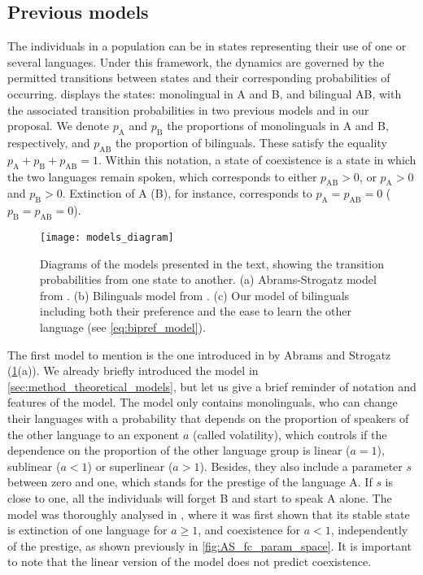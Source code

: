 \documentclass[../thesis.tex]{subfiles}
\begin{document}
\subsection{Previous models}
The individuals in a population can be in states representing their use of one or
several languages. Under this framework, the dynamics are governed by the permitted
transitions between states and their corresponding probabilities of occurring.
 displays the states: monolingual in A and B, and bilingual AB,
with the associated transition probabilities in two previous models and in our proposal.
We denote $p_{\text{A}}$ and $p_{\text{B}}$ the proportions of monolinguals in A and B,
respectively, and $p_{\text{AB}}$ the proportion of bilinguals. These satisfy the
equality $p_{\text{A}} + p_{\text{B}} + p_{\text{AB}} = 1$. Within this notation, a
state of coexistence is a state in which the two languages remain spoken, which
corresponds to either $p_{\text{AB}} > 0$, or $p_{\text{A}} > 0$ and $p_{\text{B}} > 0$.
Extinction of A (B), for instance, corresponds to $p_{\text{A}} = p_{\text{AB}} = 0$
($p_{\text{B}} = p_{\text{AB}} = 0$).
\begin{figure}
\centering
  \texttt{[image: models\_diagram]}
  \caption{Diagrams of the models presented in the text, showing the transition
  probabilities from one state to another. (a) Abrams-Strogatz model from
  \cite{AbramsModellingDynamics2003}. (b) Bilinguals model from
  \cite{CastelloOrderingDynamics2006}. (c) Our model of bilinguals including both
  their preference and the ease to learn the other language (see
  \cref{eq:bipref_model}).}
  \label{fig:multiling_models_diagram}
\end{figure}

The first model to mention is the one introduced in \cite{AbramsModellingDynamics2003}
by Abrams and Strogatz (\cref{fig:multiling_models_diagram}(a)). We already briefly introduced the
model in \cref{sec:method_theoretical_models}, but let us give a brief reminder of
notation and features of the model. The model only contains monolinguals, who can change
their languages with a probability that depends on the proportion of speakers of the
other language to an exponent $a$ (called volatility), which controls if the dependence
on the proportion of the other language group is linear ($a = 1$), sublinear ($a<1$) or
superlinear ($a>1$). Besides, they also include a parameter $s$ between zero and one,
which stands for the prestige of the language A. If $s$ is close to one, all the
individuals will forget B and start to speak A alone.
The model was thoroughly analysed in \cite{VazquezAgentBased2010}, where it was first
shown that its stable state is extinction of one language for $a \ge 1$, and coexistence
for $a < 1$, independently of the prestige, as shown previously in
\cref{fig:AS_fc_param_space}.
It is important to note that the linear version of the model does not predict
coexistence.    
\end{document}
